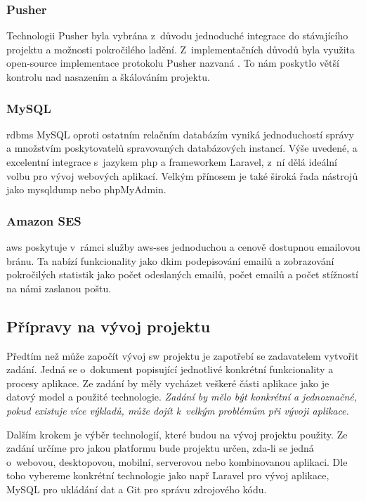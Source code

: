 \subsubsection{Pusher}

Technologii Pusher byla vybrána z~důvodu jednoduché integrace do stávajícího projektu a možnosti pokročilého ladění. Z~implementačních důvodů byla využita \gls{open-source} implementace protokolu Pusher nazvaná . To nám poskytlo větší kontrolu nad nasazením a škálováním projektu.

\subsubsection{MySQL}

\acrshort{rdbms} MySQL oproti ostatním relačním databázím vyniká jednoduchostí správy a množstvím poskytovatelů spravovaných databázových instancí\cite{mysql-vs-others}.
Výše uvedené, a excelentní integrace s~jazykem \acrshort{php} a \gls{framework}em Laravel, z~ní dělá ideální volbu pro vývoj webových aplikací.
Velkým přínosem je také široká řada nástrojů jako mysqldump\cite{mysqldump} nebo phpMyAdmin\cite{phpmyadmin}.

\subsubsection{Amazon SES}

\acrfull{aws} poskytuje v~rámci služby \acrfull{aws-ses} jednoduchou a cenově dostupnou emailovou bránu. Ta nabízí funkcionality jako \gls{dkim} podepisování emailů a zobrazování pokročilých statistik jako počet odeslaných emailů, počet  emailů\cite{email-bounce} a počet stížností na námi zaslanou poštu.

\subsection{Přípravy na vývoj projektu}

Předtím než může započít vývoj \acrshort{sw} projektu je zapotřebí se zadavatelem vytvořit zadání.
Jedná se o~dokument popisující jednotlivé konkrétní funkcionality a procesy aplikace. 
Ze zadání by měly vycházet veškeré části aplikace jako je datový model a použité technologie.
\emph{Zadání by mělo být konkrétní a jednoznačné, pokud existuje více výkladů, může dojít k~velkým problémům při vývoji aplikace.} 

Dalším krokem je výběr technologií, které budou na vývoj projektu použity.
Ze zadání určíme pro jakou platformu bude projektu určen, zda-li se jedná o~webovou, desktopovou, mobilní, serverovou nebo kombinovanou aplikaci.
Dle toho vybereme konkrétní technologie jako např Laravel\cite{laravel} pro vývoj aplikace, MySQL\cite{mysql} pro ukládání dat a Git\cite{git} pro správu zdrojového kódu.

